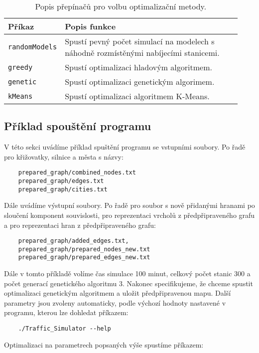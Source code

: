 \begin{table}
\centering\footnotesize\sf
\begin{tabular}{p{0.17\linewidth} p{0.76\linewidth}}
\toprule
Příkaz & Popis funkce \\
\midrule
\texttt{randomModels} & Spustí pevný počet simulací na modelech s náhodně 
rozmístěnými nabíjecími stanicemi. \\
\texttt{greedy} & Spustí optimalizaci hladovým algoritmem. \\
\texttt{genetic} & Spustí optimalizaci genetickým algorimem. \\
\texttt{kMeans} & Spustí optimalizaci algoritmem K-Means. \\
\bottomrule
\end{tabular}
\caption{Popis přepínačů pro volbu optimalizační metody.}
\label{tab:prepinace_volba_optim}
\end{table}


\subsection{Příklad spouštění programu}
V této sekci uvádíme příklad spuštění programu se vstupními soubory. Po řadě pro
křižovatky, silnice a města s názvy:
\begin{Verbatim}
    prepared_graph/combined_nodes.txt
    prepared_graph/edges.txt
    prepared_graph/cities.txt
\end{Verbatim}

Dále uvádíme výstupní soubory. Po řadě pro soubor s nově přidanými hranami
po sloučení komponent souvislosti, pro reprezentaci vrcholů z předpřipraveného grafu 
a pro reprezentaci hran z předpřipraveného grafu:
\begin{Verbatim}
    prepared_graph/added_edges.txt, 
    prepared_graph/prepared_nodes_new.txt
    prepared_graph/prepared_edges_new.txt
\end{Verbatim}

Dále v tomto příkladě volíme čas simulace 100 minut, celkový počet stanic 300 a
počet generací genetického algoritmu 3. Nakonec specifikujeme, že chceme spustit 
optimalizaci genetickým algoritmem a uložit předpřipravenou mapu. Další parametry
jsou zvoleny automaticky, podle výchozí hodnoty nastavené v programu, kterou lze
dohledat příkazem:

\begin{Verbatim}
    ./Traffic_Simulator --help
\end{Verbatim}

Optimalizaci na parametrech popsaných výše spustíme příkazem:

